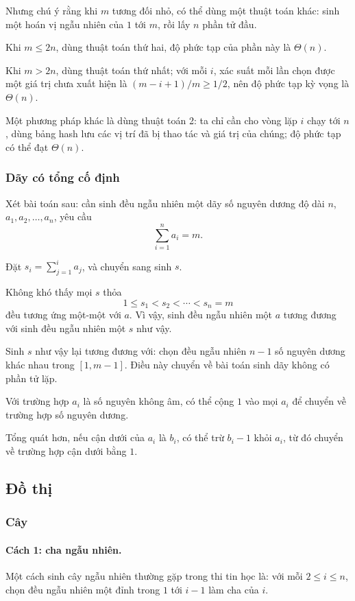 \documentclass[11pt]{article}
\begin{document}
Nhưng chú ý rằng khi $m$ tương đối nhỏ, có thể dùng một thuật toán khác: sinh
một hoán vị ngẫu nhiên của $1$ tới $m$, rồi lấy $n$ phần tử đầu.

Khi $m\le 2n$, dùng thuật toán thứ hai, độ phức tạp của phần này là
$\Theta(n)$.

Khi $m>2n$, dùng thuật toán thứ nhất; với mỗi $i$, xác suất mỗi lần chọn được
một giá trị chưa xuất hiện là $(m-i+1)/m\ge 1/2$, nên độ phức tạp kỳ vọng là
$\Theta(n)$.

Một phương pháp khác là dùng thuật toán 2: ta chỉ cần cho vòng lặp $i$ chạy tới
$n$, dùng bảng hash lưu các vị trí đã bị thao tác và giá trị của chúng; độ phức
tạp có thể đạt $\Theta(n)$.

\subsubsection{Dãy có tổng cố định}

Xét bài toán sau: cần sinh đều ngẫu nhiên một dãy số nguyên dương độ dài $n$,
$a_1,a_2,\ldots,a_n$, yêu cầu
\[
\sum_{i=1}^n a_i=m.
\]

Đặt $s_i=\sum_{j=1}^i a_j$, và chuyển sang sinh $s$.

Không khó thấy mọi $s$ thỏa
\[
1\le s_1<s_2<\cdots<s_n=m
\]
đều tương ứng một-một với $a$. Vì vậy, sinh đều ngẫu nhiên một $a$ tương đương
với sinh đều ngẫu nhiên một $s$ như vậy.

Sinh $s$ như vậy lại tương đương với: chọn đều ngẫu nhiên $n-1$ số nguyên dương
khác nhau trong $[1,m-1]$. Điều này chuyển về bài toán sinh dãy không có phần tử
lặp.

Với trường hợp $a_i$ là số nguyên không âm, có thể cộng $1$ vào mọi $a_i$ để
chuyển về trường hợp số nguyên dương.

Tổng quát hơn, nếu cận dưới của $a_i$ là $b_i$, có thể trừ $b_i-1$ khỏi $a_i$,
từ đó chuyển về trường hợp cận dưới bằng $1$.

\subsection{Đồ thị}

\subsubsection{Cây}

\paragraph{Cách 1: cha ngẫu nhiên.}
Một cách sinh cây ngẫu nhiên thường gặp trong thi tin học là: với mỗi
$2\le i\le n$, chọn đều ngẫu nhiên một đỉnh trong $1$ tới $i-1$ làm cha của
$i$.
\end{document}
